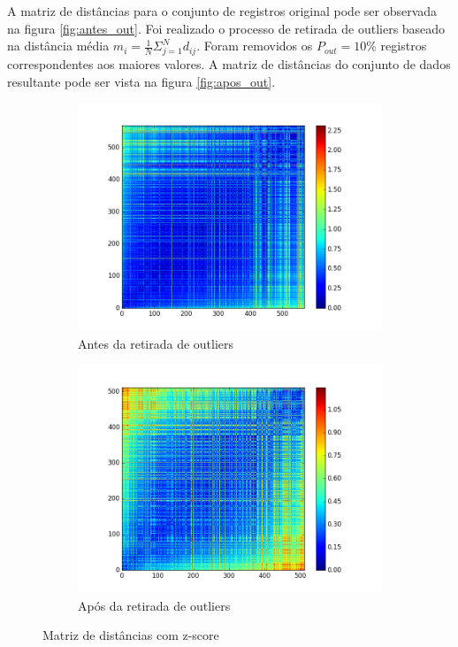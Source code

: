 \documentclass[11pt,a4paper]{article}
\numberwithin{equation}{section}
\begin{document}
A matriz de distâncias para o conjunto de registros original pode ser observada na figura \ref{fig:antes_out}. Foi realizado o processo de retirada de outliers baseado na distância média $m_i = \frac{1}{N} \Sigma^N_{j=1} d_{ij}$. Foram removidos os $P_{out} = 10\%$ registros correspondentes aos maiores valores. A matriz de distâncias do conjunto de dados resultante pode ser vista na figura \ref{fig:apos_out}.

\begin{figure}[H]
\centering
\begin{subfigure}{.5\textwidth}
  \centering
  \includegraphics[width=\linewidth]{./img/dist_zscore_out}
  \caption{Antes da retirada de outliers}
  \label{fig:zantes_out}
\end{subfigure}%
\begin{subfigure}{.5\textwidth}
  \centering
  \includegraphics[width=\linewidth]{./img/distance_zscore_clean}
  \caption{Após da retirada de outliers}
  \label{fig:zapos_out}
\end{subfigure}
\caption{Matriz de distâncias com z-score}
\label{fig:zscore}
\end{figure}
\end{document}
